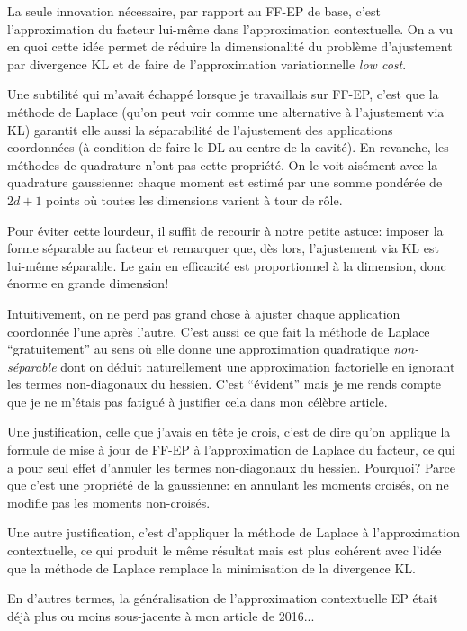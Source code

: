 \documentclass{article}
\begin{document}
La seule innovation n\'ecessaire, par rapport au FF-EP de base, c'est l'approximation du facteur lui-m\^eme dans l'approximation contextuelle. On a vu en quoi cette id\'ee permet de r\'eduire la dimensionalit\'e du probl\`eme d'ajustement par divergence KL et de faire de l'approximation variationnelle {\em low cost}.

Une subtilit\'e qui m'avait \'echapp\'e lorsque je travaillais sur FF-EP, c'est que la m\'ethode de Laplace (qu'on peut voir comme une alternative \`a l'ajustement via KL) garantit elle aussi la s\'eparabilit\'e de l'ajustement des applications coordonn\'ees (\`a condition de faire le DL au centre de la cavit\'e). En revanche, les m\'ethodes de quadrature n'ont pas cette propri\'et\'e. On le voit ais\'ement avec la quadrature gaussienne: chaque moment est estim\'e par une somme pond\'er\'ee de $2d+1$ points o\`u toutes les dimensions varient \`a tour de r\^ole.  

Pour \'eviter cette lourdeur, il suffit de recourir \`a notre petite astuce: imposer la forme s\'eparable au facteur et remarquer que, d\`es lors, l'ajustement via KL est lui-m\^eme s\'eparable. Le gain en efficacit\'e est proportionnel \`a la dimension, donc \'enorme en grande dimension!

Intuitivement, on ne perd pas grand chose \`a ajuster chaque application coordonn\'ee l'une apr\`es l'autre. C'est aussi ce que fait la m\'ethode de Laplace ``gratuitement'' au sens o\`u elle donne une approximation quadratique {\em non-s\'eparable} dont on d\'eduit naturellement une approximation factorielle en ignorant les termes non-diagonaux du hessien. C'est ``\'evident'' mais je me rends compte que je ne m'\'etais pas fatigu\'e \`a justifier cela dans mon c\'el\`ebre article. 

Une justification, celle que j'avais en t\^ete je crois, c'est de dire qu'on applique la formule de mise \`a jour de FF-EP \`a l'approximation de Laplace du facteur, ce qui a pour seul effet d'annuler les termes non-diagonaux du hessien. Pourquoi? Parce que c'est une propri\'et\'e de la gaussienne: en annulant les moments crois\'es, on ne modifie pas les moments non-crois\'es.

Une autre justification, c'est d'appliquer la m\'ethode de Laplace \`a l'approximation contextuelle, ce qui produit le m\^eme r\'esultat mais est plus coh\'erent avec l'id\'ee que la m\'ethode de Laplace remplace la minimisation de la divergence KL. 

En d'autres termes, la g\'en\'eralisation de l'approximation contextuelle EP \'etait d\'ej\`a plus ou moins sous-jacente \`a mon article de 2016...
\end{document}
